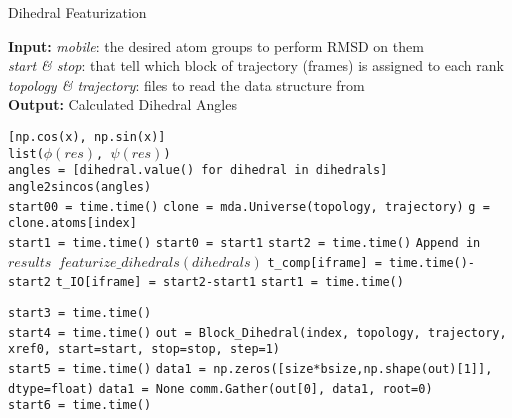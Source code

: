 \begin{algorithm}[ht!]
	\scriptsize
    \caption{Dihedral Featurization}
    \label{alg:Dihedral}
    \hspace*{\algorithmicindent} \textbf{Input:} \emph{mobile}: the desired atom groups to perform RMSD on them \\ 
    \hspace*{\algorithmicindent} \emph{start \& stop}: that tell which block of trajectory (frames) is assigned to each rank \\
    \hspace*{\algorithmicindent} \emph{topology \& trajectory}: files to read the data structure from \\
    \hspace*{\algorithmicindent} \textbf{Output:} Calculated Dihedral Angles
    \begin{algorithmic}[1]
        \State \Return \texttt{[np.cos(x), np.sin(x)]}
        \EndProcedure
        \\
        \State \texttt{list($\phi (res)$, $\psi (res)$)}
        \EndFor
        \EndProcedure
        \\
        \State \texttt{angles = [dihedral.value() for dihedral in dihedrals]}
        \State \Return \texttt{angle2sincos(angles)}
        \EndProcedure
        \\
        \State \texttt{start00 = time.time()}
        \State \texttt{clone = mda.Universe(topology, trajectory)}
        \State \texttt{g = clone.atoms[index]}
        \\
        \State \texttt{start1 = time.time()}
        \State \texttt{start0 = start1}
        \State \texttt{start2 = time.time()}
        \State \texttt{Append in $results$ $featurize\_dihedrals(dihedrals)$}
        \State \texttt{t\_comp[iframe] = time.time()-start2}
        \State \texttt{t\_IO[iframe] = start2-start1}
        \State \texttt{start1 = time.time()}
        \EndFor
        
        \State \texttt{start3 = time.time()}
        \EndProcedure
        \\        
        \State \texttt{start4 = time.time()}
	\State \texttt{out = Block\_Dihedral(index, topology, trajectory, xref0, start=start, stop=stop, step=1)}
	\\
	\State \texttt{start5 = time.time()}
   	     \State \texttt{data1 = np.zeros([size*bsize,np.shape(out)[1]], dtype=float)}
	\Else
   	     \State \texttt{data1 = None}
             \State \texttt{comm.Gather(out[0], data1, root=0)}
        \EndIf
         \\
         \State \texttt{start6 = time.time()}
    \end{algorithmic}
\end{algorithm}